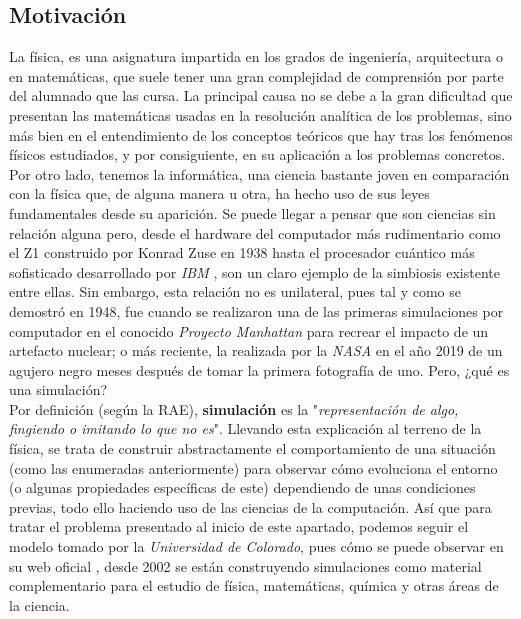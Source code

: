 \documentclass[../main.tex]{subfiles}
\begin{document}
\subsection{Motivación}
La física, es una asignatura impartida en los grados de ingeniería, arquitectura o en matemáticas, que suele tener una gran complejidad de comprensión por parte del alumnado que las cursa. La principal causa no se debe a la gran dificultad que presentan las matemáticas usadas en la resolución analítica de los problemas, sino más bien en el entendimiento de los conceptos teóricos que hay tras los fenómenos físicos estudiados, y por consiguiente, en su aplicación a los problemas concretos.\\

Por otro lado, tenemos la informática, una ciencia bastante joven en comparación con la física que, de alguna manera u otra, ha hecho uso de sus leyes fundamentales desde su aparición. Se puede llegar a pensar que son ciencias sin relación alguna pero, desde el hardware del computador más rudimentario como el Z1 \cite{historiacomputador} construido por Konrad Zuse en 1938 hasta el procesador cuántico más sofisticado desarrollado por \textit{IBM} \cite{computadorCuanticoIBM}, son un claro ejemplo de la simbiosis existente entre ellas. Sin embargo, esta relación no es unilateral, pues tal y como se demostró en 1948, fue cuando se realizaron una de las primeras simulaciones por computador \cite{simulacionComputador} en el conocido \textit{Proyecto Manhattan} para recrear el impacto de un artefacto nuclear; o más reciente, la realizada por la \textit{NASA} \cite{publicacionSimulacionNasa} en el año 2019 de un agujero negro meses después de tomar la primera fotografía de uno. Pero, ¿qué es una simulación?\\

Por definición (según la RAE), \textbf{simulación} es la "\textit{representación de algo, fingiendo o imitando lo que no es}". Llevando esta explicación al terreno de la física, se trata de construir abstractamente el comportamiento de una situación (como las enumeradas anteriormente) para observar cómo evoluciona el entorno (o algunas propiedades específicas de este) dependiendo de unas condiciones previas, todo ello haciendo uso de las ciencias de la computación. Así que para tratar el problema presentado al inicio de este apartado, podemos seguir el modelo tomado por la \textit{Universidad de Colorado}, pues cómo se puede observar en su web oficial \cite{simulacionesColorado}, desde 2002 se están construyendo simulaciones como material complementario para el estudio de física, matemáticas, química y otras áreas de la ciencia.\\
\end{document}
